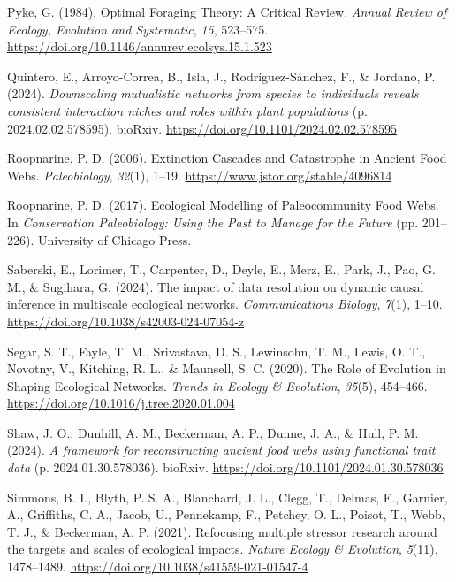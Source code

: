 \documentclass[
]{article}
\newlength{\cslhangindent}
\newenvironment{CSLReferences}[2] %
 {\begin{list}{}{%
  \setlength{\itemindent}{0pt}
  \setlength{\leftmargin}{0pt}
  \setlength{\parsep}{0pt}
  \ifodd #1
   \setlength{\leftmargin}{\cslhangindent}
   \setlength{\itemindent}{-1\cslhangindent}
  \fi
  \setlength{\itemsep}{#2\baselineskip}}}
 {\end{list}}
\begin{document}
\begin{CSLReferences}{1}{0}
Pyke, G. (1984). Optimal {Foraging Theory}: {A Critical Review}.
\emph{Annual Review of Ecology, Evolution and Systematic}, \emph{15},
523--575. \url{https://doi.org/10.1146/annurev.ecolsys.15.1.523}

Quintero, E., Arroyo-Correa, B., Isla, J., Rodríguez-Sánchez, F., \&
Jordano, P. (2024). \emph{Downscaling mutualistic networks from species
to individuals reveals consistent interaction niches and roles within
plant populations} (p. 2024.02.02.578595). bioRxiv.
\url{https://doi.org/10.1101/2024.02.02.578595}

Roopnarine, P. D. (2006). Extinction {Cascades} and {Catastrophe} in
{Ancient Food Webs}. \emph{Paleobiology}, \emph{32}(1), 1--19.
\url{https://www.jstor.org/stable/4096814}

Roopnarine, P. D. (2017). Ecological {Modelling} of {Paleocommunity Food
Webs}. In \emph{Conservation {Paleobiology}: {Using} the {Past} to
{Manage} for the {Future}} (pp. 201--226). University of Chicago Press.

Saberski, E., Lorimer, T., Carpenter, D., Deyle, E., Merz, E., Park, J.,
Pao, G. M., \& Sugihara, G. (2024). The impact of data resolution on
dynamic causal inference in multiscale ecological networks.
\emph{Communications Biology}, \emph{7}(1), 1--10.
\url{https://doi.org/10.1038/s42003-024-07054-z}

Segar, S. T., Fayle, T. M., Srivastava, D. S., Lewinsohn, T. M., Lewis,
O. T., Novotny, V., Kitching, R. L., \& Maunsell, S. C. (2020). The
{Role} of {Evolution} in {Shaping Ecological Networks}. \emph{Trends in
Ecology \& Evolution}, \emph{35}(5), 454--466.
\url{https://doi.org/10.1016/j.tree.2020.01.004}

Shaw, J. O., Dunhill, A. M., Beckerman, A. P., Dunne, J. A., \& Hull, P.
M. (2024). \emph{A framework for reconstructing ancient food webs using
functional trait data} (p. 2024.01.30.578036). bioRxiv.
\url{https://doi.org/10.1101/2024.01.30.578036}

Simmons, B. I., Blyth, P. S. A., Blanchard, J. L., Clegg, T., Delmas,
E., Garnier, A., Griffiths, C. A., Jacob, U., Pennekamp, F., Petchey, O.
L., Poisot, T., Webb, T. J., \& Beckerman, A. P. (2021). Refocusing
multiple stressor research around the targets and scales of ecological
impacts. \emph{Nature Ecology \& Evolution}, \emph{5}(11), 1478--1489.
\url{https://doi.org/10.1038/s41559-021-01547-4}


\end{CSLReferences}
\end{document}
